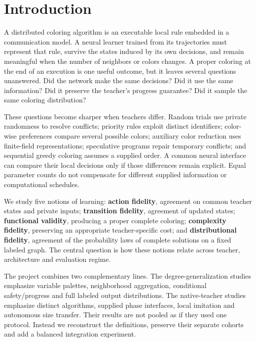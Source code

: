 \documentclass[
  11pt,
]{article}
\begin{document}
\section{Introduction}\label{introduction}

A distributed coloring algorithm is an executable local rule embedded in
a communication model. A neural learner trained from its trajectories
must represent that rule, survive the states induced by its own
decisions, and remain meaningful when the number of neighbors or colors
changes. A proper coloring at the end of an execution is one useful
outcome, but it leaves several questions unanswered. Did the network
make the same decisions? Did it use the same information? Did it
preserve the teacher's progress guarantee? Did it sample the same
coloring distribution?

These questions become sharper when teachers differ. Random trials use
private randomness to resolve conflicts; priority rules exploit distinct
identifiers; color-wise preferences compare several possible colors;
auxiliary color reduction uses finite-field representations; speculative
programs repair temporary conflicts; and sequential greedy coloring
assumes a supplied order. A common neural interface can compare their
local decisions only if those differences remain explicit. Equal
parameter counts do not compensate for different supplied information or
computational schedules.

We study five notions of learning: \textbf{action fidelity}, agreement
on common teacher states and private inputs; \textbf{transition
fidelity}, agreement of updated states; \textbf{functional validity},
producing a proper complete coloring; \textbf{complexity fidelity},
preserving an appropriate teacher-specific cost; and
\textbf{distributional fidelity}, agreement of the probability laws of
complete solutions on a fixed labeled graph. The central question is how
these notions relate across teacher, architecture and evaluation regime.

The project combines two complementary lines. The degree-generalization
studies emphasize variable palettes, neighborhood aggregation,
conditional safety/progress and full labeled output distributions. The
native-teacher studies emphasize distinct algorithms, supplied phase
interfaces, local imitation and autonomous size transfer. Their results
are not pooled as if they used one protocol. Instead we reconstruct the
definitions, preserve their separate cohorts and add a balanced
integration experiment.
\end{document}
